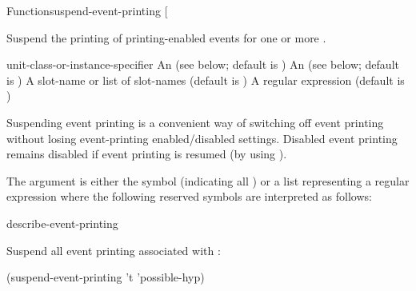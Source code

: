 \documentclass[10pt,twoside,english,pdftex]{article}
\begin{document}
\begin{functiondoc}{Function}{suspend-event-printing}%
  {[ 
    \nobr{[\var{unit-class-or-instance-specifier\/}]]}
    }
%


\fnsyntax

\fnpurpose Suspend the printing of printing-enabled events for one or more
. 

\fnpackage {}

\fnmodule {}

\fnargs
\begin{args}{unit-class-or-instance-specifier}
 An  
(see below; default is )
 An 
(see below; default is )
 A slot-name or list of slot-names
(default is )
 A  regular expression
(default is \code{(*)})
\end{args}

\fndsyntax
\W\supp\tabletop
\eventclassspec
\subeventingspec
\syntaxsep
\unitclassinstancespec
\subclassingspec

\fndescription 
Suspending event printing is a convenient way of switching off event
printing without losing event-printing enabled/disabled settings.
Disabled event printing remains disabled if event printing is
resumed (by using ).

The  argument is either the symbol  (indicating
all ) or a list representing a regular
expression where the following reserved symbols are interpreted as
follows:
\spaceinstanceregexp

\begin{alsos}{describe-event-printing}
\end{alsos}

\fnexample
Suspend all event printing associated with 
: 
%
\W\supp
\begin{example}
  (suspend-event-printing 't 'possible-hyp)
\end{example}

\fnnote
\instanceevfnsnyi

\end{functiondoc}
\end{document}

